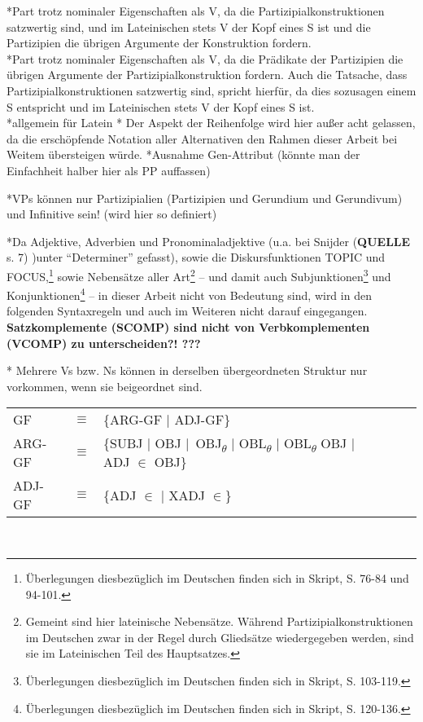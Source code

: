 \documentclass[12pt,a4paper]{article}
\begin{document}
*Part trotz nominaler Eigenschaften als V, da die Partizipialkonstruktionen satzwertig sind, und im Lateinischen stets V der Kopf eines S ist und die 
Partizipien die übrigen Argumente der Konstruktion fordern.\\

*Part trotz nominaler Eigenschaften als V, da die Prädikate der Partizipien die übrigen Argumente der Partizipialkonstruktion fordern. Auch die Tatsache, dass Partizipialkonstruktionen satzwertig sind, spricht hierfür, da dies sozusagen einem S entspricht und im Lateinischen stets V der Kopf eines S ist.\\


*allgemein für Latein
* Der Aspekt der Reihenfolge wird hier außer acht gelassen, da die erschöpfende Notation aller Alternativen den Rahmen dieser Arbeit bei Weitem übersteigen würde.
*Ausnahme Gen-Attribut (könnte man der Einfachheit halber hier als PP auffassen)

*VPs können nur Partizipialien (Partizipien und Gerundium und Gerundivum) und Infinitive sein! (wird hier so definiert)

*Da Adjektive, Adverbien und Pronominaladjektive (u.a. bei Snijder (\textbf{QUELLE} s. 7) )unter ``Determiner'' gefasst), sowie die Diskursfunktionen TOPIC und FOCUS,\footnote{Überlegungen diesbezüglich im Deutschen finden sich in Skript, S. 76-84 und 94-101.} sowie Nebensätze aller Art\footnote{Gemeint sind hier lateinische Nebensätze. Während Partizipialkonstruktionen im Deutschen zwar in der Regel durch Gliedsätze wiedergegeben werden, sind sie im Lateinischen Teil des Hauptsatzes.} -- und damit auch Subjunktionen\footnote{Überlegungen diesbezüglich im Deutschen finden sich in Skript, S. 103-119.} und Konjunktionen\footnote{Überlegungen diesbezüglich im Deutschen finden sich in Skript, S. 120-136.} -- in dieser Arbeit nicht von Bedeutung sind, wird in den folgenden Syntaxregeln und auch im Weiteren nicht darauf eingegangen. \textbf{Satzkomplemente (SCOMP) sind nicht von Verbkomplementen (VCOMP) zu unterscheiden?! ???}

* Mehrere Vs bzw. Ns können in derselben übergeordneten Struktur nur vorkommen, wenn sie beigeordnet sind.

\begin{singlespace}
\begin{tabular}{ l  l  l  c  c  c  c }
GF & $\equiv$ & \{ARG-GF $\mid$ ADJ-GF\} \\
ARG-GF & $\equiv$ & \{SUBJ $\mid$ OBJ $\mid$\ OBJ\textsubscript{$\theta$} $\mid$ OBL\textsubscript{$\theta$} $\mid$ OBL\textsubscript{$\theta$} OBJ $\mid$ ADJ $\in$ OBJ\} \\
ADJ-GF & $\equiv$ & \{ADJ $\in$ $\mid$ XADJ $\in$\} \\
\end{tabular}\\
\end{singlespace}
\end{document}
